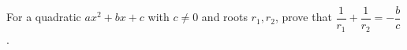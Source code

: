 For a quadratic $ax^2+bx+c$ with $c\ne0$ and roots $r_1,r_2$, prove that $\dfrac1{r_1}+\dfrac1{r_2}=-\dfrac bc$.
